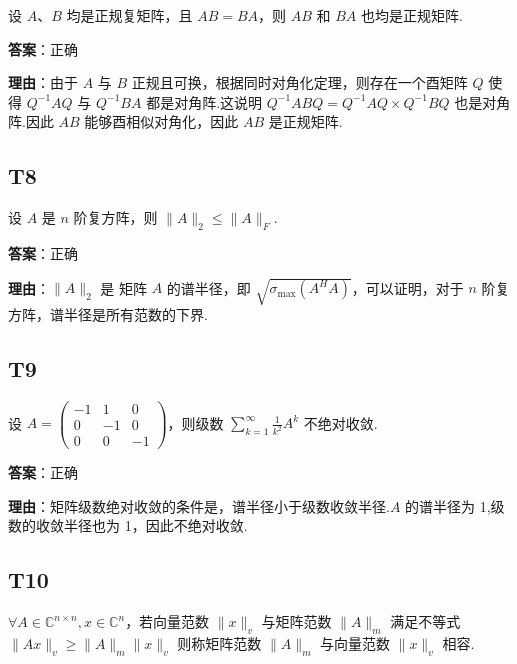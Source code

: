 \documentclass{article}
\begin{document}
\par 设 $A、B$ 均是正规复矩阵，且 $AB=BA$，则 $AB$ 和 $BA$ 也均是正规矩阵.

\par \textbf{答案}：正确

\par \textbf{理由}：由于 $A$ 与 $B$ 正规且可换，根据同时对角化定理，则存在一个酉矩阵 $Q$ 使得 $Q^{-1}AQ$ 与 $Q^{-1}BA$ 都是对角阵.这说明 $Q^{-1}ABQ = Q^{-1}AQ\times Q^{-1}BQ$ 也是对角阵.因此 $AB$ 能够酉相似对角化，因此 $AB$ 是正规矩阵.

\subsection{T8}

\par 设 $A$ 是 $n$ 阶复方阵，则 $\|A\|_2\leq \|A\|_F$.

\par \textbf{答案}：正确

\par \textbf{理由}：$\|A\|_2$ 是 矩阵 $A$ 的谱半径，即 $\sqrt{\sigma_{\text{max}}(A^HA)}$，可以证明，对于 $n$ 阶复方阵，谱半径是所有范数的下界.

\subsection{T9}

\par 设 $A=\begin{pmatrix}-1 & 1 & 0\\0 & -1 & 0\\0 & 0 &-1\end{pmatrix}$，则级数 $\sum_{k=1}^{\infty}\frac{1}{k^2}A^k$ 不绝对收敛.

\par \textbf{答案}：正确

\par \textbf{理由}：矩阵级数绝对收敛的条件是，谱半径小于级数收敛半径.$A$ 的谱半径为 1,级数的收敛半径也为 1，因此不绝对收敛.

\subsection{T10}

\par $\forall A\in \mathbb C^{n\times n}, x\in \mathbb C^n$，若向量范数 $\|x\|_v$ 与矩阵范数 $\|A\|_m$ 满足不等式 $\|Ax\|_v\geq \|A\|_m \|x\|_v$ 则称矩阵范数 $\|A\|_m$ 与向量范数 $\|x\|_v$ 相容.
\end{document}
